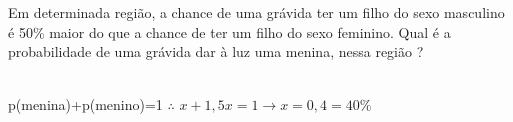 \begin{ex}
Em determinada região, a chance de uma grávida ter um filho do sexo masculino é 50\% maior do que a chance de ter um filho do sexo feminino. Qual é a probabilidade de uma grávida dar à luz uma menina, nessa região ?  \begin{sol}
  \phantom{A} \\
  p(menina)+p(menino)=1 \hspace{0,5cm} $\therefore$ \hspace{0,5cm}
  $ x+1,5x=1 \rightarrow x= 0,4=40\%$
\end{sol}
\end{ex}